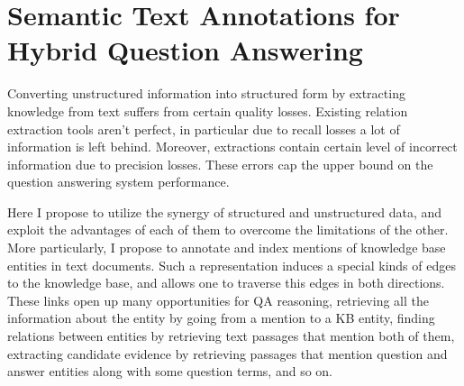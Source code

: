 



\section{Semantic Text Annotations for Hybrid Question Answering}
\label{sec:text+kb}

Converting unstructured information into structured form by extracting knowledge from text suffers from certain quality losses.
Existing relation extraction tools aren't perfect, in particular due to recall losses a lot of information is left behind.
Moreover, extractions contain certain level of incorrect information due to precision losses.
These errors cap the upper bound on the question answering system performance.

Here I propose to utilize the synergy of structured and unstructured data, and exploit the advantages of each of them to overcome the limitations of the other.
More particularly, I propose to annotate and index mentions of knowledge base entities in text documents.
Such a representation induces a special kinds of edges to the knowledge base, and allows one to traverse this edges in both directions.
These links open up many opportunities for QA reasoning, \eg retrieving all the information about the entity by going from a mention to a KB entity, finding relations between entities by retrieving text passages that mention both of them, extracting candidate evidence by retrieving passages that mention question and answer entities along with some question terms, and so on.

